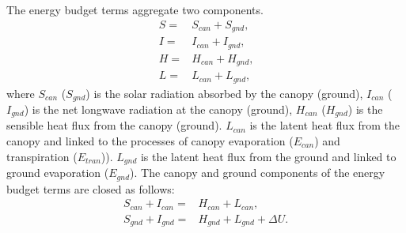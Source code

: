 \documentclass[essd]{copernicus}
\begin{document}
The energy budget terms aggregate two components.
\begin{align}
    S = & S_{can} + S_{gnd} \text{,} \\
    I = & I_{can} + I_{gnd} \text{,} \\
    H = & H_{can} + H_{gnd} \text{,} \\
    L = & L_{can} + L_{gnd} \text{,}
\end{align}
where $S_{can}$ ($S_{gnd}$) is the solar radiation absorbed by the canopy (ground), $I_{can}$ ($I_{gnd}$) is the net longwave radiation at the canopy (ground), $H_{can}$ ($H_{gnd}$) is the sensible heat flux from the canopy (ground). $L_{can}$ is the latent heat flux from the canopy and linked to the processes of canopy evaporation ($E_{can}$) and transpiration ($E_{tran}$)). $L_{gnd}$ is the latent heat flux from the ground and linked to ground evaporation ($E_{gnd}$). The canopy and ground components of the energy budget terms are closed as follows:
\begin{align}
    S_{can} + I_{can} = & H_{can} + L_{can} \text{,}            \\
    S_{gnd} + I_{gnd} = & H_{gnd} + L_{gnd} + \Delta U \text{.}
\end{align}
\end{document}
